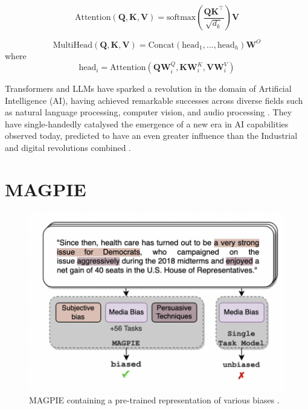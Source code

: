 \begin{equation}
    \label{eq:attention}
    \text{Attention}(\mathbf{Q}, \mathbf{K}, \mathbf{V}) = \text{softmax}\left( \frac{\mathbf{Q}\mathbf{K}^\top}{\sqrt{d_k}} \right) \mathbf{V}
\end{equation}

\begin{equation}
    \label{eq:multihead}
    \text{MultiHead}(\mathbf{Q}, \mathbf{K}, \mathbf{V}) = \text{Concat}(\text{head}_1, \ldots, \text{head}_h) \mathbf{W}^O
\end{equation}
where
\[
    \text{head}_i = \text{Attention}(\mathbf{Q} \mathbf{W}^Q_i, \mathbf{K} \mathbf{W}^K_i, \mathbf{V} \mathbf{W}^V_i)
\]

Transformers and LLMs have sparked a revolution in the domain of Artificial Intelligence (AI), having achieved remarkable successes across diverse fields such as natural language processing, computer vision, and audio processing \cite{lin-2022-survey-transformers}. They have single-handedly catalysed the emergence of a new era in AI capabilities observed today, predicted to have an even greater influence than the Industrial and digital revolutions combined \cite{makridakis-2017-ai-revolution}.

\section{MAGPIE}

\begin{figure}[htbp]
    \centering
    \includegraphics[width=0.9\linewidth]{images/magpie.png}
    \caption{MAGPIE containing a pre-trained representation of various biases \cite{horych-2024-magpie}.}
    \label{fig:magpie}
\end{figure}


